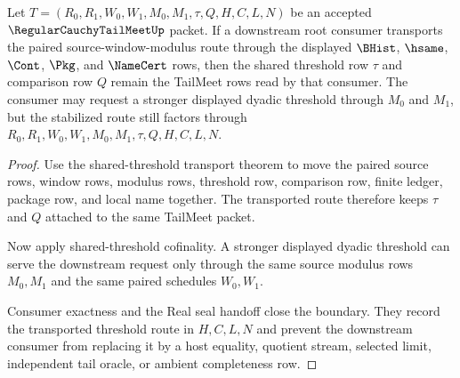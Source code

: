 \begin{theorem}
\label{thm:regular-cauchy-tail-meet-root-downstream-threshold-stability}
Let $T=(R_0,R_1,W_0,W_1,M_0,M_1,\tau,Q,H,C,L,N)$ be an accepted
$\RegularCauchyTailMeetUp$ packet. If a downstream root consumer transports the
paired source-window-modulus route through the displayed $\BHist$, $\hsame$,
$\Cont$, $\Pkg$, and $\NameCert$ rows, then the shared threshold row $\tau$ and
comparison row $Q$ remain the TailMeet rows read by that consumer. The consumer
may request a stronger displayed dyadic threshold through $M_0$ and $M_1$, but
the stabilized route still factors through $R_0,R_1,W_0,W_1,M_0,M_1,\tau,Q,H,C,L,N$.
\end{theorem}
\begin{proof}
Use the shared-threshold transport theorem to move the paired source rows,
window rows, modulus rows, threshold row, comparison row, finite ledger, package
row, and local name together. The transported route therefore keeps $\tau$ and
$Q$ attached to the same TailMeet packet.

Now apply shared-threshold cofinality. A stronger displayed dyadic threshold can
serve the downstream request only through the same source modulus rows
$M_0,M_1$ and the same paired schedules $W_0,W_1$.

Consumer exactness and the Real seal handoff close the boundary. They record the
transported threshold route in $H,C,L,N$ and prevent the downstream consumer from
replacing it by a host equality, quotient stream, selected limit, independent
tail oracle, or ambient completeness row.
\end{proof}

